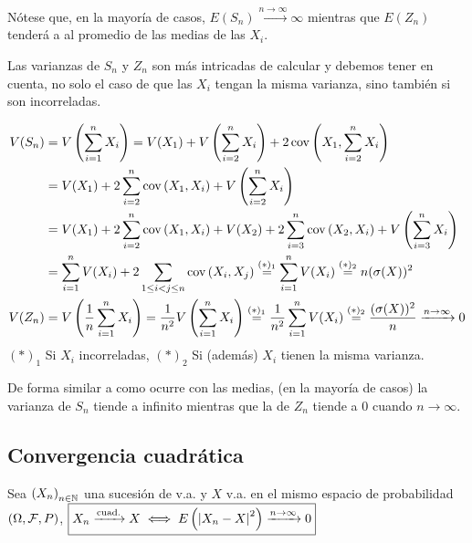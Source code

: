 Nótese que, en la mayoría de casos, $E(S_n) \xrightarrow{n\to\infty} \infty$ mientras que $E(Z_n)$ tenderá a al promedio de las medias de las $X_i$.

Las varianzas de $S_n$ y $Z_n$ son más intricadas de calcular y debemos tener en cuenta, no solo el caso de que las $X_i$ tengan la misma varianza, sino también si son incorreladas.

\[\begin{aligned}
		V(S_n) & = V\left(\sum_{i=1}^{n} X_i\right) = V(X_1) + V\left(\sum_{i=2}^{n} X_i\right) + 2 \operatorname{cov}\left(X_1, \sum_{i=2}^{n} X_i\right)                                                                                                             \\
		       & = V(X_1) + 2 \sum_{i=2}^{n} \operatorname{cov}\left(X_1, X_i\right) + V\left(\sum_{i=2}^{n} X_i\right)                                                                                                                                                \\
		       & = V(X_1) + 2 \sum_{i=2}^{n} \operatorname{cov}\left(X_1, X_i\right) + V(X_2) + 2 \sum_{i=3}^{n} \operatorname{cov}\left(X_2, X_i\right) + V\left(\sum_{i=3}^{n} X_i\right)                                                                                                     \\
		       & = \sum_{i=1}^{n} V(X_i) + 2 \sum_{1\leq i < j \leq n} \operatorname{cov}\left(X_i,X_j\right) \stackrel{(*)_1}{=} \sum_{i=1}^{n} V(X_i) \stackrel{(*)_2}{=} n(\sigma(X))^2                                                                             \\
		V(Z_n) & = V\left(\frac{1}{n}\sum_{i=1}^{n} X_i\right) = \frac{1}{n^2} V\left(\sum_{i=1}^{n} X_i\right) \stackrel{(*)_1}{=} \frac{1}{n^2}\sum_{i=1}^{n} V(X_i) \stackrel{(*)_2}{=} \frac{(\sigma(X))^2}{n} \xrightarrow{n\to\infty} 0
	\end{aligned}\]
\hspace*{\fill} $(*)_1$ Si $X_i$ incorreladas, $(*)_2$ Si (además) $X_i$ tienen la misma varianza.

De forma similar a como ocurre con las medias, (en la mayoría de casos) la varianza de $S_n$ tiende a infinito mientras que la de $Z_n$ tiende a 0 cuando $n\to\infty$.

\subsection{Convergencia cuadrática}

\begin{defn}
	Sea $\left(X_n\right)_{n\in \mathbb{N}}$ una sucesión de v.a. y $X$ v.a. en el mismo espacio de probabilidad $(\Omega, \mathcal{F}, P)$, $\displaystyle \boxed{X_n \xrightarrow{\text{cuad.}} X \iff E\left(\left|X_n - X\right|^2\right) \xrightarrow{n\to\infty} 0}$
\end{defn}

